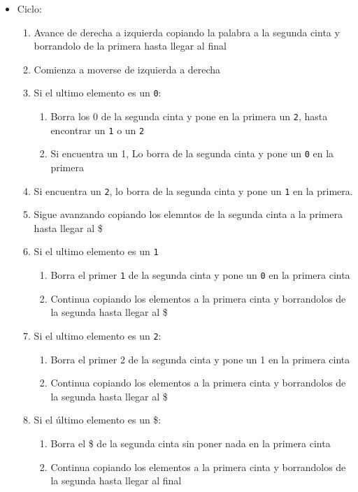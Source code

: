 \begin{itemize}
    \item Ciclo:
    \begin{enumerate}
        \item Avance de derecha a izquierda copiando la palabra a la segunda cinta y borrandolo de la primera hasta llegar al final
        \item Comienza a moverse de izquierda a derecha
        \item Si el ultimo elemento es un \texttt{0}:
        \begin{enumerate}[1.]
            \item Borra los 0 de la segunda cinta y pone en la primera un \texttt{2}, hasta encontrar un \texttt{1} o un \texttt{2}
            \item Si encuentra un 1, Lo borra de la segunda cinta y pone un \texttt{0} en la primera
        \end{enumerate}
        \item Si encuentra un \texttt{2}, lo borra de la segunda cinta y pone un \texttt{1} en la primera.
        \item Sigue avanzando copiando los elemntos de la segunda cinta a la primera hasta llegar al \$
        \item Si el ultimo elemento es un \texttt{1}
        \begin{enumerate}[1.]
            \item Borra el primer \texttt{1} de la segunda cinta y pone un \texttt{0} en la primera cinta
            \item Continua copiando los elementos a la primera cinta y borrandolos de la segunda hasta llegar al \$
        \end{enumerate} 
        \item Si el ultimo elemento es un \texttt{2}:
        \begin{enumerate}[1.]
            \item Borra el primer 2 de la segunda cinta y pone un 1 en la primera cinta
            \item Continua copiando los elementos a la primera cinta y borrandolos de la segunda hasta llegar al \$
        \end{enumerate} 
        \item Si el último elemento es un \$:
        \begin{enumerate}[1.]
            \item Borra el \$ de la segunda cinta sin poner nada en la primera cinta
            \item Continua copiando los elementos a la primera cinta y borrandolos de la segunda hasta llegar al final

\end{enumerate}
\end{enumerate}
\end{itemize}
